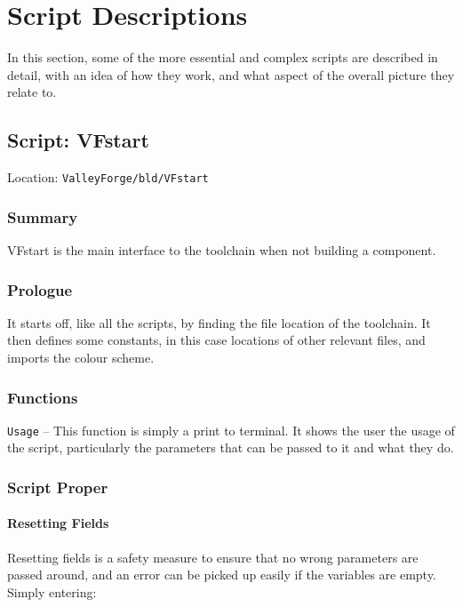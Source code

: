 \documentclass[a4paper, oneside, 11pt, titlepage, onecolumn, openright]{report}
\begin{document}
\pagebreak
			
\chapter{Script Descriptions}
			\label{C:ScriptDescriptions}
			In this section, some of the more essential and complex scripts are described in detail, with an idea of how they work, and what aspect of the overall picture they relate to.

\section{Script: VFstart}
			\label{s:VFstart}
			Location: \texttt{ValleyForge/bld/VFstart}
		
\subsection{Summary}
			\label{ss:VFstartSummary}		
			VFstart is the main interface to the toolchain when not building a component.
			
\subsection{Prologue}
			\label{ss:VFstartPrologue}
			It starts off, like all the scripts, by finding the file location of the toolchain. It then defines some constants, in this case locations of other relevant files, and imports the colour scheme.

\subsection{Functions}
			\label{ss:VFstartFunctions}			
			\texttt{Usage} -- This function is simply a print to terminal. It shows the user the usage of the script, particularly the parameters that can be passed to it and what they do. 
			
\subsection{Script Proper}
			\label{ss:VFstartScriptProper}
			
\subsubsection{Resetting Fields}
			\label{sss:VFstartResettingFields}

			Resetting fields is a safety measure to ensure that no wrong parameters are passed around, and an error can be picked up easily if the variables are empty. Simply entering:
			
\end{document}
